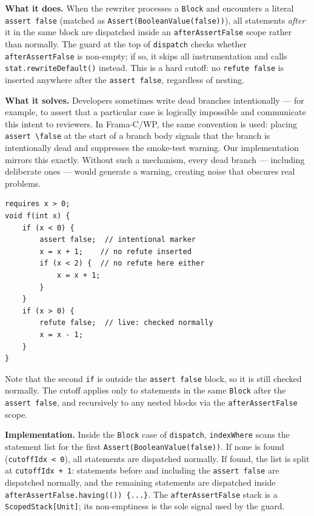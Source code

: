 \documentclass[9pt,a4paper,twocolumn]{article}
\begin{document}
\textbf{What it does.} When the rewriter processes a
\texttt{Block} and encounters a literal \texttt{assert false}
(matched as \texttt{Assert(BooleanValue(false))}), all statements
\emph{after} it in the same block are dispatched inside an
\texttt{afterAssertFalse} scope rather than normally. The guard at
the top of \texttt{dispatch} checks whether
\texttt{afterAssertFalse} is non-empty; if so, it skips all
instrumentation and calls \texttt{stat.rewriteDefault()} instead.
This is a hard cutoff: no \texttt{refute false} is inserted
anywhere after the \texttt{assert false}, regardless of nesting.

\textbf{What it solves.} Developers sometimes write dead branches
intentionally — for example, to assert that a particular case is
logically impossible and communicate this intent to reviewers. In
Frama-C/WP, the same convention is used: placing
\texttt{assert \textbackslash false} at the start of a branch body
signals that the branch is intentionally dead and suppresses the
smoke-test warning. Our implementation mirrors this exactly.
Without such a mechanism, every dead branch — including deliberate
ones — would generate a warning, creating noise that obscures real
problems.

\begin{lstlisting}
requires x > 0;
void f(int x) {
    if (x < 0) {
        assert false;  // intentional marker
        x = x + 1;    // no refute inserted
        if (x < 2) {  // no refute here either
            x = x + 1;
        }
    }
    if (x > 0) {
        refute false;  // live: checked normally
        x = x - 1;
    }
}
\end{lstlisting}

Note that the second \texttt{if} is outside the
\texttt{assert false} block, so it is still checked normally.
The cutoff applies only to statements in the same \texttt{Block}
after the \texttt{assert false}, and recursively to any nested
blocks via the \texttt{afterAssertFalse} scope.

\textbf{Implementation.} Inside the \texttt{Block} case of
\texttt{dispatch}, \texttt{indexWhere} scans the statement list for
the first \texttt{Assert(BooleanValue(false))}. If none is found
(\texttt{cutoffIdx < 0}), all statements are dispatched normally.
If found, the list is split at \texttt{cutoffIdx + 1}: statements
before and including the \texttt{assert false} are dispatched
normally, and the remaining statements are dispatched inside
\texttt{afterAssertFalse.having(()) \{...\}}. The
\texttt{afterAssertFalse} stack is a \texttt{ScopedStack[Unit]};
its non-emptiness is the sole signal used by the guard.
\end{document}
